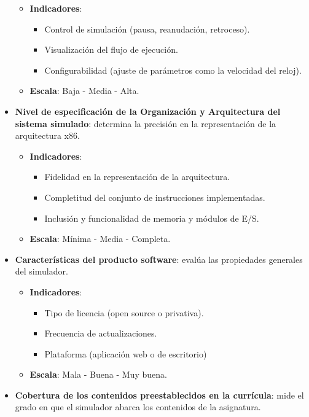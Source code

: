 \documentclass[12pt,oneside]{templates/unerthesis}
\providecommand{\tightlist}{%
  \setlength{\itemsep}{0pt}\setlength{\parskip}{0pt}}
\begin{document}
\begin{itemize}
  \begin{itemize}
  \tightlist
  \item
    \textbf{Indicadores}:

    \begin{itemize}
    \tightlist
    \item
      Control de simulación (pausa, reanudación, retroceso).
    \item
      Visualización del flujo de ejecución.
    \item
      Configurabilidad (ajuste de parámetros como la velocidad del reloj).
    \end{itemize}
  \item
    \textbf{Escala}: Baja - Media - Alta.
  \end{itemize}
\item
  \textbf{Nivel de especificación de la Organización y Arquitectura del sistema simulado}: determina la precisión en la representación de la arquitectura x86.

  \begin{itemize}
  \tightlist
  \item
    \textbf{Indicadores}:

    \begin{itemize}
    \tightlist
    \item
      Fidelidad en la representación de la arquitectura.
    \item
      Completitud del conjunto de instrucciones implementadas.
    \item
      Inclusión y funcionalidad de memoria y módulos de E/S.
    \end{itemize}
  \item
    \textbf{Escala}: Mínima - Media - Completa.
  \end{itemize}
\item
  \textbf{Características del producto software}: evalúa las propiedades generales del simulador.

  \begin{itemize}
  \tightlist
  \item
    \textbf{Indicadores}:

    \begin{itemize}
    \tightlist
    \item
      Tipo de licencia (open source o privativa).
    \item
      Frecuencia de actualizaciones.
    \item
      Plataforma (aplicación web o de escritorio)
    \end{itemize}
  \item
    \textbf{Escala}: Mala - Buena - Muy buena.
  \end{itemize}
\item
  \textbf{Cobertura de los contenidos preestablecidos en la currícula}: mide el grado en que el simulador abarca los contenidos de la asignatura.


\end{itemize}
\end{document}
